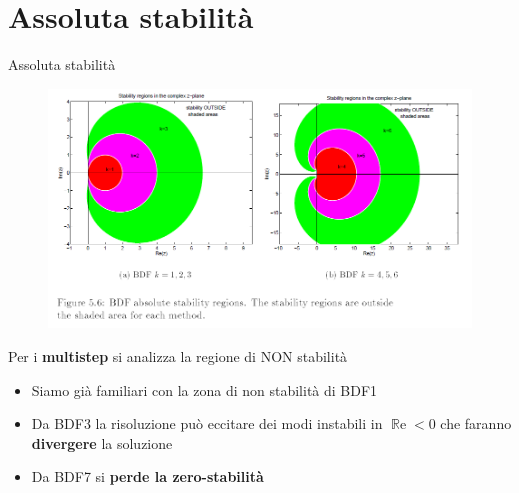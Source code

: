 \documentclass[aspectratio=169, 10pt, handout,usenames,dvipsnames]{beamer}
\begin{document}
 \section{Assoluta stabilità}%
    \begin{frame}{Assoluta stabilità}
        \begin{figure}
        \centering
        \includegraphics[width=.7\linewidth]{fig7.png}
        \label{fig:abs_stability}
        \end{figure}
        Per i \textbf{multistep} si analizza la regione di NON stabilità
        \begin{itemize}
            \item Siamo già familiari con la zona di non stabilità di BDF1
            \item Da BDF3 la risoluzione può eccitare dei modi instabili in $\operatorname{\mathbb{R}e}<0$ che faranno \textbf{divergere} la soluzione
            \item Da BDF7 si \textbf{perde la zero-stabilità}
        \end{itemize}
    \end{frame}
\end{document}
